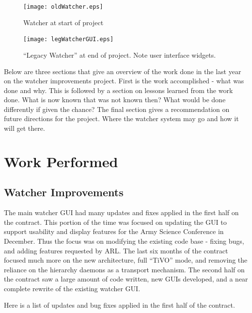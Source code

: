 \documentclass{report}
\begin{document}
\begin{figure}[htb]
\centering
\texttt{[image: oldWatcher.eps]}
\caption{Watcher at start of project}
\label{fig:oldWatcher}
\end{figure}

\begin{figure}[htb]
\centering
\texttt{[image: legWatcherGUI.eps]}
\caption{``Legacy Watcher'' at end of project. Note user interface widgets.}
\label{fig:legWatcherGUI}
\end{figure}

Below are three sections that give an overview of the work done in the last year on the watcher improvements project. First
is the work accomplished - what was done and why. This is followed by a section on lessons learned from the work done. What is now known 
that was not known then? What would be done differently if given the chance? The final section gives a recommendation on future directions
for the project. Where the watcher system may go and how it will get there. 

\section{Work Performed}

\subsection{Watcher Improvements}
The main watcher GUI had many updates and fixes applied in the first half on the contract. This portion of the time was focused on updating the GUI to 
support usability and display features for the Army Science Conference in December. Thus the focus was on modifying the existing code base - fixing bugs, 
and adding features requested by ARL. The last six months of the contract focused much more on the new architecture, full ``TiVO'' mode, and removing 
the reliance on the hierarchy daemons as a transport mechanism. The second half on the contract saw a large amount of code written, new GUIs developed, and 
a near complete rewrite of the existing watcher GUI. 

Here is a list of updates and bug fixes applied in the first half of the contract.
\end{document}

